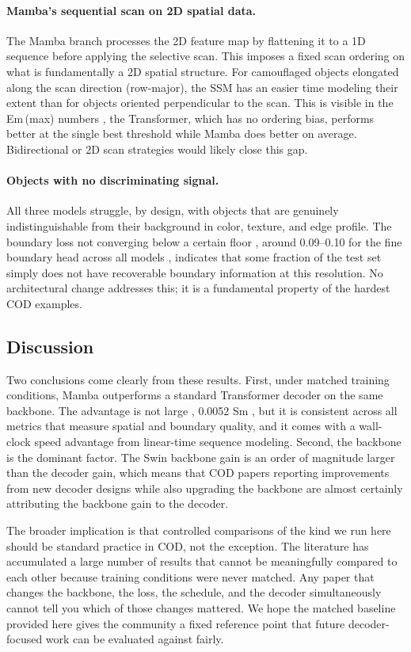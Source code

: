 \documentclass[10pt,conference]{IEEEtran}
\begin{document}
\paragraph{\textbf{Mamba's sequential scan on 2D spatial data.}} The Mamba branch processes the 2D feature map by flattening it to a 1D sequence before applying the selective scan. This imposes a fixed scan ordering on what is fundamentally a 2D spatial structure. For camouflaged objects elongated along the scan direction (row-major), the SSM has an easier time modeling their extent than for objects oriented perpendicular to the scan. This is visible in the Em\,(max) numbers , the Transformer, which has no ordering bias, performs better at the single best threshold while Mamba does better on average. Bidirectional or 2D scan strategies would likely close this gap.

\paragraph{\textbf{Objects with no discriminating signal.}} All three models struggle, by design, with objects that are genuinely indistinguishable from their background in color, texture, and edge profile. The boundary loss not converging below a certain floor , around 0.09--0.10 for the fine boundary head across all models , indicates that some fraction of the test set simply does not have recoverable boundary information at this resolution. No architectural change addresses this; it is a fundamental property of the hardest COD examples.

\subsection{Discussion}
Two conclusions come clearly from these results. First, under matched training conditions, Mamba outperforms a standard Transformer decoder on the same backbone. The advantage is not large , 0.0052 Sm , but it is consistent across all metrics that measure spatial and boundary quality, and it comes with a wall-clock speed advantage from linear-time sequence modeling. Second, the backbone is the dominant factor. The Swin backbone gain is an order of magnitude larger than the decoder gain, which means that COD papers reporting improvements from new decoder designs while also upgrading the backbone are almost certainly attributing the backbone gain to the decoder.

The broader implication is that controlled comparisons of the kind we run here should be standard practice in COD, not the exception. The literature has accumulated a large number of results that cannot be meaningfully compared to each other because training conditions were never matched. Any paper that changes the backbone, the loss, the schedule, and the decoder simultaneously cannot tell you which of those changes mattered. We hope the matched baseline provided here gives the community a fixed reference point that future decoder-focused work can be evaluated against fairly.
\end{document}
